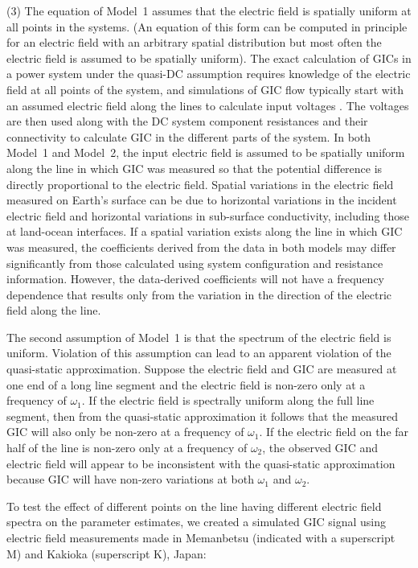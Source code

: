 \documentclass[draft,linenumbers]{agujournal2018}
\begin{document}
(3) The equation of Model~1 assumes that the electric field is spatially uniform at all points in the systems. (An equation of this form can be computed in principle for an electric field with an arbitrary spatial distribution but most often the electric field is assumed to be spatially uniform). The exact calculation of GICs in a power system under the quasi-DC assumption requires knowledge of the electric field at all points of the system, and simulations of GIC flow typically start with an assumed electric field along the lines to calculate input voltages \citep{Albertson1981,Lehtinen1985, Horton2012}. The voltages are then used along with the DC system component resistances and their connectivity to calculate GIC in the different parts of the system. In both Model~1 and Model~2, the input electric field is assumed to be spatially uniform along the line in which GIC was measured so that the potential difference is directly proportional to the electric field. Spatial variations in the electric field measured on Earth's surface can be due to horizontal variations in the incident electric field and horizontal variations in sub-surface conductivity, including those at land-ocean interfaces. If a spatial variation exists along the line in which GIC was measured, the coefficients derived from the data in both models may differ significantly from those calculated using system configuration and resistance information. However, the data-derived coefficients will not have a frequency dependence that results only from the variation in the direction of the electric field along the line.

The second assumption of Model~1 is that the spectrum of the electric field is uniform. Violation of this assumption can lead to an apparent violation of the quasi-static approximation. Suppose the electric field and GIC are measured at one end of a long line segment and the electric field is non-zero only at a frequency of $\omega_1$. If the electric field is spectrally uniform along the full line segment, then from the quasi-static approximation it follows that the measured GIC will also only be non-zero at a frequency of $\omega_1$. If the electric field on the far half of the line is non-zero only at a frequency of $\omega_2$, the observed GIC and electric field will appear to be inconsistent with the quasi-static approximation because GIC will have non-zero variations at both $\omega_1$ and $\omega_2$.

To test the effect of different points on the line having different electric field spectra on the parameter estimates, we created a simulated GIC signal using electric field measurements made in Memanbetsu (indicated with a superscript M) and Kakioka (superscript K), Japan:
\end{document}
